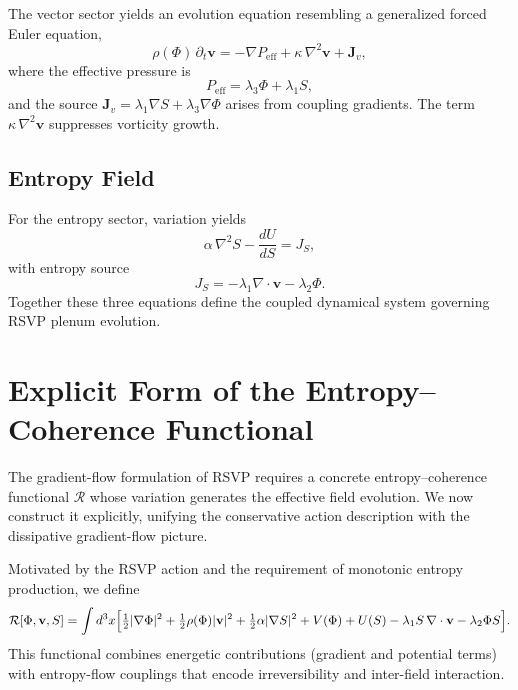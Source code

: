 \documentclass[12pt,a4paper]{article}
\theoremstyle{plain}
\theoremstyle{definition}
\theoremstyle{remark}
\begin{document}
The vector sector yields an evolution equation resembling a generalized
forced Euler equation,
\begin{equation}
\rho(\Phi)\,\partial_t \mathbf{v} =
-\nabla P_{\text{eff}}
+ \kappa\,\nabla^2 \mathbf{v}
+ \mathbf{J}_v,
\end{equation}
where the effective pressure is
\begin{equation}
P_{\text{eff}} = \lambda_3 \Phi + \lambda_1 S,
\end{equation}
and the source $\mathbf{J}_v = \lambda_1 \nabla S + \lambda_3 \nabla \Phi$
arises from coupling gradients. The term $\kappa\,\nabla^2\mathbf{v}$
suppresses vorticity growth.

\subsection{Entropy Field}

For the entropy sector, variation yields
\begin{equation}
\alpha\,\nabla^2 S - \frac{dU}{dS} = J_S,
\end{equation}
with entropy source
\begin{equation}
J_S = -\lambda_1 \nabla \cdot \mathbf{v} - \lambda_2 \Phi.
\end{equation}
Together these three equations define the coupled dynamical system
governing RSVP plenum evolution.

\section{Explicit Form of the Entropy--Coherence Functional}
\label{sec:Rfunctional}

The gradient-flow formulation of RSVP requires a concrete
entropy--coherence functional $\mathcal{R}$ whose variation generates
the effective field evolution. We now construct it explicitly, unifying
the conservative action description with the dissipative gradient-flow
picture.

Motivated by the RSVP action and the requirement of monotonic entropy
production, we define
\begin{equation}
\mathcal{R}[\Phi,\mathbf{v},S] =
\int d^3x \Bigl[
\tfrac{1}{2}|\nabla \Phi|^2
+ \tfrac{1}{2}\rho(\Phi)|\mathbf{v}|^2
+ \tfrac{1}{2}\alpha|\nabla S|^2
+ V(\Phi) + U(S)
- \lambda_1 S\,\nabla \cdot \mathbf{v}
- \lambda_2 \Phi S
\Bigr].
\end{equation}
This functional combines energetic contributions (gradient and
potential terms) with entropy-flow couplings that encode
irreversibility and inter-field interaction.
\end{document}
